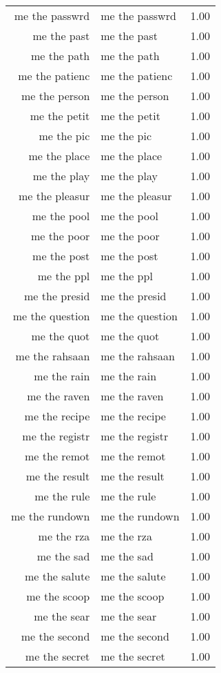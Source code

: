 \begin{table}[ht]
\begin{tabular}{rlr}
  me the passwrd & me the passwrd & 1.00 \\ 
  me the past & me the past & 1.00 \\ 
  me the path & me the path & 1.00 \\ 
  me the patienc & me the patienc & 1.00 \\ 
  me the person & me the person & 1.00 \\ 
  me the petit & me the petit & 1.00 \\ 
  me the pic & me the pic & 1.00 \\ 
  me the place & me the place & 1.00 \\ 
  me the play & me the play & 1.00 \\ 
  me the pleasur & me the pleasur & 1.00 \\ 
  me the pool & me the pool & 1.00 \\ 
  me the poor & me the poor & 1.00 \\ 
  me the post & me the post & 1.00 \\ 
  me the ppl & me the ppl & 1.00 \\ 
  me the presid & me the presid & 1.00 \\ 
  me the question & me the question & 1.00 \\ 
  me the quot & me the quot & 1.00 \\ 
  me the rahsaan & me the rahsaan & 1.00 \\ 
  me the rain & me the rain & 1.00 \\ 
  me the raven & me the raven & 1.00 \\ 
  me the recipe & me the recipe & 1.00 \\ 
  me the registr & me the registr & 1.00 \\ 
  me the remot & me the remot & 1.00 \\ 
  me the result & me the result & 1.00 \\ 
  me the rule & me the rule & 1.00 \\ 
  me the rundown & me the rundown & 1.00 \\ 
  me the rza & me the rza & 1.00 \\ 
  me the sad & me the sad & 1.00 \\ 
  me the salute & me the salute & 1.00 \\ 
  me the scoop & me the scoop & 1.00 \\ 
  me the sear & me the sear & 1.00 \\ 
  me the second & me the second & 1.00 \\ 
  me the secret & me the secret & 1.00 \\ 

\end{tabular}
\end{table}
